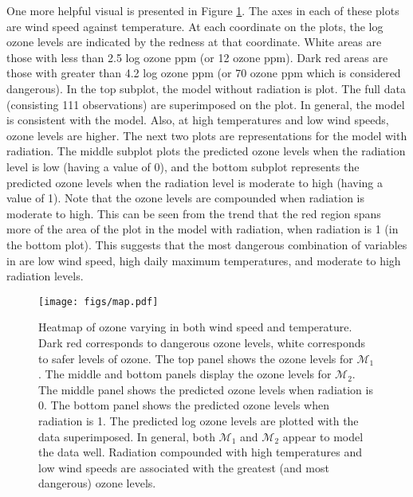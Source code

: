 \documentclass{../../tex_template/asaproc}
\newcommand{\M}{\mathcal{M}}
\begin{document}
One more helpful visual is presented in Figure \ref{fig:map}.  The axes in each
of these plots are wind speed against temperature. At each coordinate on the
plots, the log ozone levels are indicated by the redness at that coordinate.
White areas are those with less than 2.5 log ozone ppm (or 12 ozone ppm).  Dark
red areas are those with greater than 4.2 log ozone ppm (or 70 ozone ppm which
is considered dangerous). In the top subplot, the model without radiation is plot.
The full data (consisting 111 observations) are superimposed on the plot.
In general, the model is consistent with the model. Also, at high temperatures
and low wind speeds, ozone levels are higher. The next two plots are representations
for the model with radiation. The middle subplot plots the predicted ozone levels
when the radiation level is low (having a value of 0), and the
bottom subplot represents the predicted ozone levels when the radiation level is 
moderate to high (having a value of 1). Note that the ozone levels are compounded
when radiation is moderate to high. This can be seen from the trend that
the red region spans more of the area of the plot in the model with radiation,
when radiation is 1 (in the bottom plot). This suggests that the most dangerous
combination of variables in are low wind speed, high daily maximum
temperatures, and moderate to high radiation levels.

\begin{figure}[H]
  \texttt{[image: figs/map.pdf]}
  \caption{\small Heatmap of ozone varying in both wind speed and temperature. 
    Dark red corresponds to dangerous ozone levels, white corresponds to safer
    levels of ozone.  The top panel shows the ozone levels for $\M_1$. The
    middle and bottom panels display the ozone levels for $\M_2$. The middle
    panel shows the predicted ozone levels when radiation is 0. The bottom
    panel shows the predicted ozone levels when radiation is 1. The predicted
    log ozone levels are plotted with the data superimposed.  In general, both
    $\M_1$ and $\M_2$ appear to model the data well. Radiation compounded with
    high temperatures and low wind speeds are associated with the greatest
    (and most dangerous) ozone levels.}
  \label{fig:map}
\end{figure}

\end{document}
